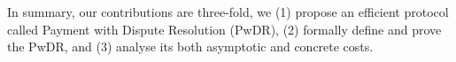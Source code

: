 In summary,  our contributions are three-fold, we (1) propose an efficient protocol called Payment with Dispute Resolution (PwDR), (2) formally define and prove the PwDR, and (3) analyse its both asymptotic and concrete costs.     






% 
%
% 





